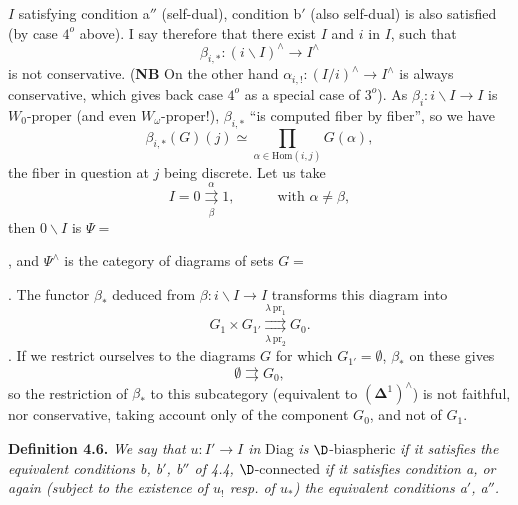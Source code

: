 
$I$ satisfying condition a$''$ (self-dual), condition b$'$ (also self-dual) is also satisfied (by case $4^o$ above). I say therefore that there exist $I$ and $i$ in $I$, such that
\[
\beta_{i,*} : (i\backslash I)^\wedge \longrightarrow I^\wedge
\]
is not conservative. (\textbf{NB} On the other hand $\alpha_{i,!} : (I/i)^\wedge \longrightarrow I^\wedge$ is always conservative, which gives back case $4^o$ as a special case of $3^o$). As $\beta_i : i\backslash I \longrightarrow I$ is $W_0$-proper (and even $W_\omega$-proper!), $\beta_{i,*}$ ``is computed fiber by fiber'', so we have
\[
\beta_{i,*}(G)(j) \simeq \prod_{\alpha\in\mathrm{Hom}(i,j)} G(\alpha),
\]
the fiber in question at $j$ being discrete. Let us take
\[
I = 0 \underset{\beta}{\overset{\alpha}{\rightrightarrows}} 1, \qquad\quad \text{with } \alpha \neq \beta,
\]
then $0\backslash I$ is $\Psi = {}$, and $\Psi^\wedge$ is the category of diagrams of sets $G = {}$. The functor $\beta_*$ deduced from $\beta : i\backslash I \longrightarrow I$ transforms this diagram into
\[
G_1 \times G_{1'} \underset{\lambda\,\mathrm{pr}_2}{\overset{\lambda\,\mathrm{pr}_1}{\rightrightarrows}} G_0.
\]
. If we restrict ourselves to the diagrams $G$ for which $G_{1'} = \emptyset$, $\beta_*$ on these gives
\[
\emptyset \rightrightarrows G_0,
\]
so the restriction of $\beta_*$ to this subcategory (equivalent to $(\boldsymbol{\Delta}^1)^\wedge$) is not faithful, nor conservative, taking account only of the component $G_0$, and not of $G_1$.


\textbf{Definition 4.6.} \textit{We say that $u : I' \longrightarrow I$ in} Diag \textit{is} $\D$-biaspheric \textit{if it satisfies the equivalent conditions b, b$'$, b$''$ of 4.4,} $\D$-connected \textit{if it satisfies condition a, or again (subject to the existence of $u_!$ resp. of $u_*$) the equivalent conditions a$'$, a$''$.} %

